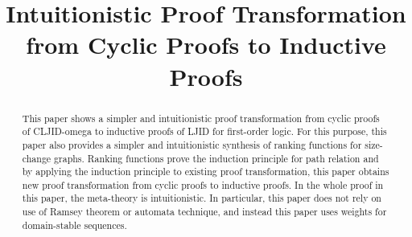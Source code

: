 \title{Intuitionistic Proof Transformation from Cyclic Proofs to Inductive Proofs}

\author{}\institute{}

\maketitle

\begin{abstract}

This paper shows a simpler and intuitionistic proof transformation
from cyclic proofs of CLJID-omega to inductive proofs of LJID for
first-order logic.  For this purpose, this paper also provides a
simpler and intuitionistic synthesis of ranking functions for
size-change graphs.  Ranking functions prove the induction principle
for path relation and by applying the induction principle to existing
proof transformation, this paper obtains new proof transformation from
cyclic proofs to inductive proofs.  In the whole proof in this paper,
the meta-theory is intuitionistic.  In particular, this paper does not
rely on use of Ramsey theorem or automata technique, and instead this
paper uses weights for domain-stable sequences.

\end{abstract}

